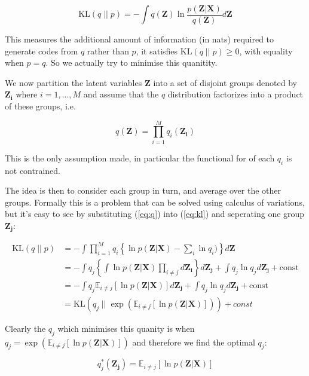 \documentclass{article}
\begin{document}
\begin{equation}
\label{eq:kl}
   \text{KL} (q\; ||\; p) = -\int q(\boldsymbol{Z}) \ln \frac{p(\boldsymbol{Z} | \boldsymbol{X})}{q(\boldsymbol{Z})} d\boldsymbol{Z}
\end{equation}

This measures the additional amount of information (in nats) required to generate codes from $q$ rather than $p$, it satisfies $\text{KL}(q\; ||\; p) \ge 0$, with equality when $p = q$. So we actually try to minimise this quanitity.

We now partition the latent variables $\boldsymbol{Z}$ into a set of disjoint groups denoted by $\boldsymbol{Z_i}$ where $i = 1, ..., M$ and assume that the $q$ distribution factorizes into a product of these groups, i.e.

\begin{equation}
\label{eq:q}
  q(\boldsymbol{Z}) = \prod_{i = 1}^M q_i(\boldsymbol{Z_i})
\end{equation}

This is the only assumption made, in particular the functional for of each $q_i$ is not contrained.

The idea is then to consider each group in turn, and average over the other groups. Formally this is a problem that can be solved using calculus of variations, but it's easy to see by substituting (\ref{eq:q}) into (\ref{eq:kl}) and seperating one group $\boldsymbol{Z_j}$:

\begin{align}
    \text{KL}(q\; ||\; p) &= -\int \prod_{i = 1}^M q_i \left\{ \ln p(\boldsymbol{Z} | \boldsymbol{X}) - \sum_i \ln q_i) \right\} d \boldsymbol{Z} \\
    &= -\int q_j \left\{ \int \ln p(\boldsymbol{Z} | \boldsymbol{X}) \prod_{i \ne j} d \boldsymbol{Z_i} \right\} d \boldsymbol{Z_j} + \int q_j \ln q_j d \boldsymbol{Z_j} + \text{const}\\
    &= -\int q_j \mathbb{E}_{i \ne j}[\ln p(\boldsymbol{Z} | \boldsymbol{X})] d \boldsymbol{Z_j} + \int q_j \ln q_j d \boldsymbol{Z_j} + \text{const}\\
    &= \text{KL}(q_j\; ||\; \exp (\mathbb{E}_{i \ne j}[\ln p(\boldsymbol{Z} | \boldsymbol{X})])) + const
\end{align}

Clearly the $q_j$ which minimises this quanity is when $q_j = \exp(\mathbb{E}_{i \ne j}[\ln p(\boldsymbol{Z} | \boldsymbol{X})])$ and therefore we find the optimal $q_j$:

\begin{equation}
\label{eq:q_opt}
q^*_j(\boldsymbol{Z_j}) = \mathbb{E}_{i \ne j}[\ln p(\boldsymbol{Z} | \boldsymbol{X})]
\end{equation}
\end{document}
